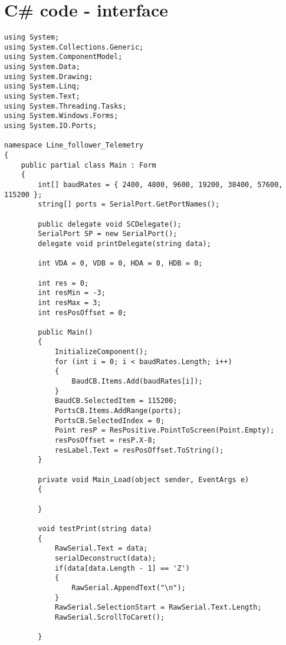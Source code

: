 \newpage
\section{C\# code - interface}
\begin{lstlisting}
using System;
using System.Collections.Generic;
using System.ComponentModel;
using System.Data;
using System.Drawing;
using System.Linq;
using System.Text;
using System.Threading.Tasks;
using System.Windows.Forms;
using System.IO.Ports;

namespace Line_follower_Telemetry
{
    public partial class Main : Form
    {
        int[] baudRates = { 2400, 4800, 9600, 19200, 38400, 57600, 115200 };
        string[] ports = SerialPort.GetPortNames();
        
        public delegate void SCDelegate();
        SerialPort SP = new SerialPort();
        delegate void printDelegate(string data);

        int VDA = 0, VDB = 0, HDA = 0, HDB = 0;

        int res = 0;
        int resMin = -3;
        int resMax = 3;
        int resPosOffset = 0;

        public Main()
        {
            InitializeComponent();
            for (int i = 0; i < baudRates.Length; i++)
            {
                BaudCB.Items.Add(baudRates[i]);
            }
            BaudCB.SelectedItem = 115200;
            PortsCB.Items.AddRange(ports);
            PortsCB.SelectedIndex = 0;
            Point resP = ResPositive.PointToScreen(Point.Empty);
            resPosOffset = resP.X-8;
            resLabel.Text = resPosOffset.ToString();
        }

        private void Main_Load(object sender, EventArgs e)
        {

        }

        void testPrint(string data)
        {
            RawSerial.Text = data;
            serialDeconstruct(data);
            if(data[data.Length - 1] == 'Z')
            {
                RawSerial.AppendText("\n");
            }
            RawSerial.SelectionStart = RawSerial.Text.Length;
            RawSerial.ScrollToCaret();
            
        }


\end{lstlisting}
